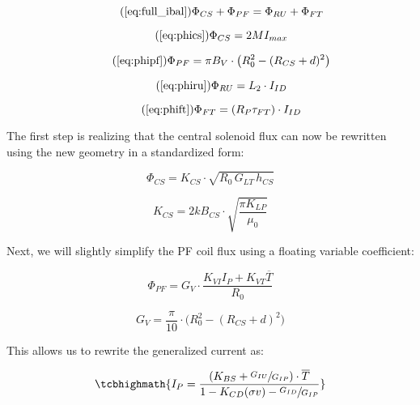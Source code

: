 \begin{equation}
	\tag{\ref{eq:full_ibal}}
	\Phi_{CS} + \Phi_{PF} = \Phi_{RU} + \Phi_{FT}
\end{equation}

\begin{equation}
	\tag{\ref{eq:phics}}
	\Phi_{CS} = 2 M I_{max}
\end{equation}

\begin{equation}
	\tag{\ref{eq:phipf}}
	\Phi_{PF} = \pi B_V \cdot \left( R_0^2 - ( R_{CS} + d ) ^ 2 \right)
\end{equation}

\begin{equation}
	\tag{\ref{eq:phiru}}
	\Phi_{RU} = L_2 \cdot I_{ID}
\end{equation}

\begin{equation}
	\tag{\ref{eq:phift}}
	\Phi_{FT} = ( R_P \tau_{FT} ) \cdot I_{ID}
\end{equation}

The first step is realizing that the central solenoid flux can now be rewritten using the new geometry in a standardized form:

\begin{equation}
	\Phi_{CS} = K_{CS} \cdot \sqrt{ R_0 \, G_{LT} \, h_{CS} }
\end{equation}

\begin{equation}
	K_{CS} = 2 k B_{CS} \cdot \sqrt{ \frac{ \pi K_{LP} }{ \mu_0 } }
\end{equation}

Next, we will slightly simplify the PF coil flux using a floating variable coefficient:

\begin{equation}
	\Phi_{PF} = G_V \cdot \frac{ K_{VI} I_P + K_{VT} \overline T }{R_0}
\end{equation}

\begin{equation}
	G_V = \frac{ \pi }{ 10 } \cdot \big( R_0^2 - \left( R_{CS} + d \right) ^2 \big)
\end{equation}

This allows us to rewrite the generalized current as:

\begin{equation}
	\label{eq:gen_ip}
	\tcbhighmath{
	I_P = \frac{ \left( K_{BS} + \sfrac{ G_{IU} }{ G_{IP} } \right) \cdot \overline T }{ 1 - K_{CD} ( \sigma v ) - \sfrac{ G_{ID} }{ G_{IP} } }
	}
\end{equation}

